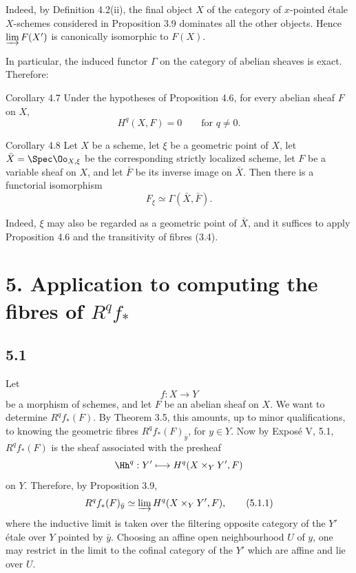 Indeed, by Definition 4.2(ii), the final object \(X\) of the category of \(x\)-pointed \'etale \(X\)-schemes considered in Proposition 3.9 dominates all the other objects. Hence \(\varinjlim F(X')\) is canonically isomorphic to \(F(X)\). \qedtext

In particular, the induced functor \(\Gamma\) on the category of abelian sheaves is exact. Therefore:

\begin{statement}{Corollary 4.7}
Under the hypotheses of Proposition 4.6, for every abelian sheaf \(F\) on \(X\),
\[
H^q(X,F)=0\qquad\text{for }q\ne 0.
\]
\end{statement}

\begin{statement}{Corollary 4.8}
Let \(X\) be a scheme, let \(\xi\) be a geometric point of \(X\), let \(\bar X=\Spec\Oo_{X,\xi}\) be the corresponding strictly localized scheme, let \(F\) be a variable sheaf on \(X\), and let \(\bar F\) be its inverse image on \(\bar X\). Then there is a functorial isomorphism
\[
F_\xi\simeq \Gamma(\bar X,\bar F).
\]
\end{statement}

Indeed, \(\xi\) may also be regarded as a geometric point of \(\bar X\), and it suffices to apply Proposition 4.6 and the transitivity of fibres (3.4).

\section*{5. Application to computing the fibres of \(R^qf_*\)}

\subsection*{5.1}
Let
\[
f:X\to Y
\]
be a morphism of schemes, and let \(F\) be an abelian sheaf on \(X\). We want to determine \(R^qf_*(F)\). By Theorem 3.5, this amounts, up to minor qualifications, to knowing the geometric fibres \(R^qf_*(F)_{\bar y}\), for \(y\in Y\). Now by Expos\'e V, 5.1, \(R^qf_*(F)\) is the sheaf associated with the presheaf
\[
\Hh^q:Y'\longmapsto H^q(X\times_YY',F)
\]
on \(Y\). Therefore, by Proposition 3.9,
\[
R^qf_*(F)_{\bar y}\simeq \varinjlim H^q(X\times_YY',F),
\tag{5.1.1}
\]
where the inductive limit is taken over the filtering opposite category of the \(Y'\) \'etale over \(Y\) pointed by \(\bar y\). Choosing an affine open neighbourhood \(U\) of \(y\), one may restrict in the limit to the cofinal category of the \(Y'\) which are affine and lie over \(U\).

